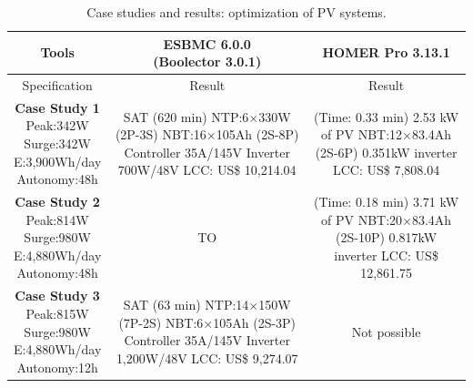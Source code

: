 \documentclass[journal]{IEEEtran}
\begin{document}
\begin{table}
\caption{Case studies and results: optimization of PV systems.}\label{tab1}
\begin{scriptsize}
\begin{tabular}{c|c|c}
\hline
\hline
Tools & \makecell{ESBMC 6.0.0 \\(Boolector 3.0.1)}& HOMER Pro 3.13.1\\
\hline
\hline
Specification & Result & Result\\
\hline
\makecell{\textbf{Case Study 1}\\Peak:342W\\Surge:342W \\E:3,900Wh/day\\Autonomy:48h} & \makecell{SAT (620 min) \\NTP:6$\times$330W (2P-3S)\\NBT:16$\times$105Ah (2S-8P)\\Controller 35A/145V\\Inverter 700W/48V\\LCC: US\$ 10,214.04} & \makecell{(Time: 0.33 min)\\2.53 kW of PV\\NBT:12$\times$83.4Ah (2S-6P)\\0.351kW inverter\\LCC: US\$ 7,808.04}\\
\hline
\makecell{\textbf{Case Study 2}\\Peak:814W\\Surge:980W\\E:4,880Wh/day\\Autonomy:48h} & TO & \makecell{(Time: 0.18 min)\\3.71 kW of PV\\NBT:20$\times$83.4Ah (2S-10P)\\0.817kW inverter\\LCC: US\$ 12,861.75} \\
\hline
\makecell{\textbf{Case Study 3}\\Peak:815W\\Surge:980W\\E:4,880Wh/day\\Autonomy:12h} & \makecell{SAT (63 min) \\NTP:14$\times$150W (7P-2S)\\NBT:6$\times$105Ah (2S-3P)\\Controller 35A/145V\\Inverter 1,200W/48V\\LCC: US\$ 9,274.07} & Not possible \\

\end{tabular}
\end{scriptsize}
\end{table}
\end{document}
